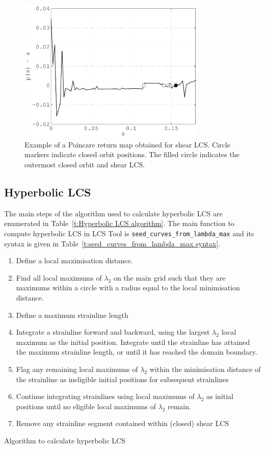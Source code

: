 \documentclass{article}
\begin{document}
\begin{figure}
\begin{center}
\includegraphics[width=0.8\textwidth]{graphics/double_gyre/poincare_return_map}
\end{center}
\caption{Example of a Poincare return map obtained for shear LCS. Circle markers indicate closed orbit positions. The filled circle indicates the outermost closed orbit and shear LCS.}
\label{f:Poincare return map}
\end{figure}

\subsection{Hyperbolic LCS}

The main steps of the algorithm used to calculate hyperbolic LCS are enumerated in Table~\ref{t:Hyperbolic LCS algorithm}. The main function to compute hyperbolic LCS in LCS Tool is \lstinline!seed_curves_from_lambda_max! and its syntax is given in Table~\ref{t:seed_curves_from_lambda_max syntax}.

\begin{table}
\begin{enumerate}
\item Define a local maximisation distance.
\item Find all local maximums of $\lambda_2$ on the main grid such that they are maximums within a circle with a radius equal to the local minimisation distance.
\item Define a maximum strainline length
\item Integrate a strainline forward and backward, using the largest $\lambda_2$ local maximum as the initial position. Integrate until the strainline has attained the maximum strainline length, or until it has reached the domain boundary.
\item Flag any remaining local maximums of $\lambda_2$ within the minimisation distance of the strainline as ineligible initial positions for subsequent strainlines
\item Continue integrating strainlines using local maximums of $\lambda_2$ as initial positions until no eligible local maximums of $\lambda_2$ remain.
\item Remove any strainline segment contained within (closed) shear LCS
\end{enumerate}
\caption{Algorithm to calculate hyperbolic LCS}
\label{t:Hyperbolic LCS algorithm}
\end{table}
\end{document}
